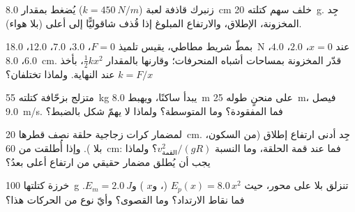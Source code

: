 \begin{exercise}[$\star\star$]\label{exo:g12:work-and-energy:6}
زنبرك قاذفة لعبة ($k = \qty{450}{N/m}$) يُضغط بمقدار
\qty{8.0}{cm} خلف سهم كتلته \qty{20}{g}. جِد  المخزونة، 
الإطلاق، والارتفاع المبلوغ إذا قُذف شاقوليًّا إلى أعلى (بلا هواء).
\end{exercise}

\begin{exercise}[$\star\star$]\label{exo:g12:work-and-energy:7}
بمطّ شريط مطاطي، يقيس تلميذ $F = 0$، $3.0$، $7.0$،
$12.0$، \qty{18.0}{N} عند $x = 0$، $2.0$، $4.0$، $6.0$، \qty{8.0}{cm}.
قدّر  المخزونة بمساحات أشباه المنحرفات؛ وقارنها بالمقدار
$\tfrac12 kx^2$، بأخذ $k = F/x$ عند النهاية. ولماذا تختلفان؟
\end{exercise}

\begin{exercise}[$\star\star$]\label{exo:g12:work-and-energy:8}
متزلج بزحّافة كتلته \qty{55}{kg} يبدأ ساكنًا، ويهبط \qty{8.0}{m} على
 منحنٍ طوله \qty{25}{m}، فيصل  \qty{9.0}{m/s}. فما  المفقودة؟ وما   المتوسطة؟ ولماذا لا يهمّ شكل  بالضبط؟
\end{exercise}

\begin{exercise}[$\star\star$]\label{exo:g12:work-and-energy:9}
لمضمار كرات زجاجية حلقة نصف قطرها \qty{20}{cm}. جِد أدنى
ارتفاع إطلاق (من السكون، بلا ). وإذا أُطلقت من \qty{60}{cm}:
فما  عند قمة الحلقة، وما النسبة $v_{\text{القمة}}^2/(gR)$؟ ولماذا يجب
أن يُطلق مضمار حقيقي من ارتفاع أعلى بعدُ؟
\end{exercise}

\begin{exercise}[$\star\star$]\label{exo:g12:work-and-energy:10}
خرزة كتلتها \qty{100}{g} تنزلق بلا  على محور، حيث
$E_p(x) = 8.0\,x^2$ (، و$x$ ) و$E_m = \qty{2.0}{J}$.
فما نقاط الارتداد؟ وما  القصوى؟ وأيّ نوع من الحركات هذا؟
\end{exercise}

